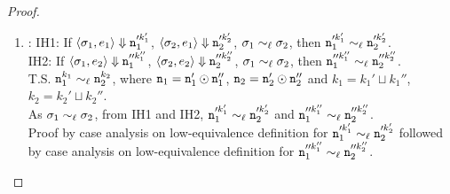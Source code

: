 \begin{proof}
\begin{enumerate}
\item {}: IH1: If $\langle \sigma_1, e_1 \rangle \Downarrow
  \texttt{n}_1'^{k_1'}$, $\langle \sigma_2, e_1 \rangle \Downarrow
  \texttt{n}_2'^{k_2'}$, $\sigma_1 \sim_\ell \sigma_2$, then $\texttt{n}_1'^{k_1'}
  \sim_\ell \texttt{n}_2'^{k_2'}$.\\
IH2: If $\langle \sigma_1, e_2 \rangle \Downarrow
  \texttt{n}_1''^{k_1''}$, $\langle \sigma_2, e_2 \rangle \Downarrow
  \texttt{n}_2''^{k_2''}$, $\sigma_1 \sim_\ell \sigma_2$, then $\texttt{n}_1''^{k_1''}
  \sim_\ell \texttt{n}_2''^{k_2''}$.\\
T.S. $\texttt{n}_1^{k_1} \sim_\ell \texttt{n}_2^{k_2}$, where $\texttt{n}_1 = \texttt{n}_1' \odot \texttt{n}_1''$, $\texttt{n}_2 = \texttt{n}_2' \odot \texttt{n}_2''$ 
and $k_1 = k_1' \sqcup k_1''$, $k_2 = k_2' \sqcup k_2''$.\\
As $\sigma_1 \sim_\ell \sigma_2$, from IH1 and IH2, $\texttt{n}_1'^{k_1'}
  \sim_\ell \texttt{n}_2'^{k_2'}$ and $\texttt{n}_1''^{k_1''}  \sim_\ell \texttt{n}_2''^{k_2''}$.\\
Proof by case analysis on low-equivalence definition for $\texttt{n}_1'^{k_1'} 
  \sim_\ell \texttt{n}_2'^{k_2'}$ followed by case analysis on low-equivalence definition for $\texttt{n}_1''^{k_1''}
  \sim_\ell \texttt{n}_2''^{k_2''}$.

\end{enumerate}
\end{proof}
